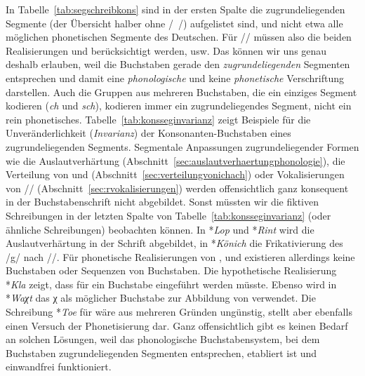 In Tabelle~\ref{tab:segschreibkons} sind in der ersten Spalte die zugrundeliegenden Segmente (der Übersicht halber ohne /~/) aufgelistet sind, und nicht etwa alle möglichen phonetischen Segmente des Deutschen.
Für // müssen also die beiden Realisierungen \textipa{[\c{c}]} und \textipa{[X]} berücksichtigt werden, usw.
Das können wir uns genau deshalb erlauben, weil die Buchstaben gerade den \textit{zugrundeliegenden} Segmenten entsprechen und damit eine \textit{phonologische} und keine \textit{phonetische} Verschriftung darstellen.
Auch die Gruppen aus mehreren Buchstaben, die ein einziges Segment kodieren (\zB \textit{ch} und \textit{sch}), kodieren immer ein zugrundeliegendes Segment, nicht ein rein phonetisches. 
Tabelle~\ref{tab:konsseginvarianz} zeigt Beispiele für die Unveränderlichkeit (\textit{Invarianz}) der Konsonanten-Buchstaben eines zugrundeliegenden Segments.
Segmentale Anpassungen zugrundeliegender Formen wie die Auslautverhärtung (Abschnitt~\ref{sec:auslautverhaertungphonologie}), die Verteilung von \textipa{[\c{c}]} und \textipa{[X]} (Abschnitt~\ref{sec:verteilungvonichach}) oder Vokalisierungen von // (Abschnitt~\ref{sec:rvokalisierungen}) werden offensichtlich ganz konsequent in der Buchstabenschrift nicht abgebildet.
Sonst müssten wir die fiktiven Schreibungen in der letzten Spalte von Tabelle~\ref{tab:konsseginvarianz} (oder ähnliche Schreibungen) beobachten können.
In *\textit{Lop} und *\textit{Rint} wird die Auslautverhärtung in der Schrift abgebildet, in *\textit{Könich} die Frikativierung des /g/ nach //. 
Für phonetische Realisierungen von \textipa{[N]}, \textipa{[X]} und \textipa{[5]} existieren allerdings keine Buchstaben oder Sequenzen von Buchstaben.
Die hypothetische Realisierung *\textit{Kla} zeigt, dass für \textipa{[N]} ein Buchstabe eingeführt werden müsste.
Ebenso wird in *\textit{Waχt} das χ als möglicher Buchstabe zur Abbildung von \textipa{[X]} verwendet.
Die Schreibung *\textit{Toe} für \textipa{[t\t{o5}]} wäre aus mehreren Gründen ungünstig, stellt aber ebenfalls einen Versuch der Phonetisierung dar.
Ganz offensichtlich gibt es keinen Bedarf an solchen Lösungen, weil das phonologische Buchstabensystem, bei dem Buchstaben zugrundeliegenden Segmenten entsprechen, etabliert ist und einwandfrei funktioniert.


